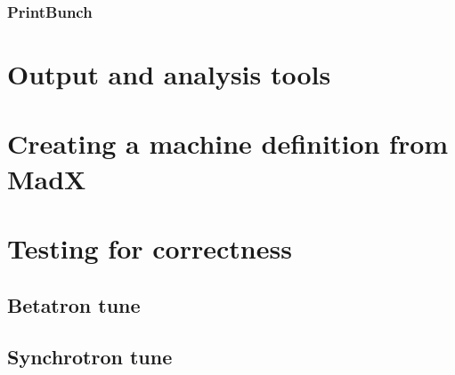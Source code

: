 \documentclass[a4paper]{report}
\begin{document}
\subsection{PrintBunch}

\chapter{Output and analysis tools}

\appendix
\chapter{Creating a machine definition from MadX}
\label{sec:MadX}

\chapter{Testing for correctness}
\section{Betatron tune}

\section{Synchrotron tune}
\end{document}
